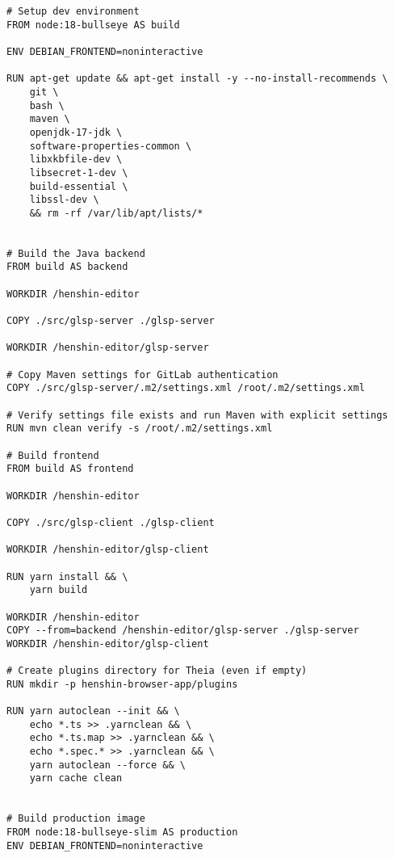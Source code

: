 
\begin{lstlisting}[language=Docker, caption={Dockerfile for Henshin Web Model Transformation Application}, label={lst:dockerfile}]
# Setup dev environment
FROM node:18-bullseye AS build

ENV DEBIAN_FRONTEND=noninteractive

RUN apt-get update && apt-get install -y --no-install-recommends \
    git \
    bash \
    maven \
    openjdk-17-jdk \
    software-properties-common \
    libxkbfile-dev \
    libsecret-1-dev \
    build-essential \
    libssl-dev \
    && rm -rf /var/lib/apt/lists/*


# Build the Java backend
FROM build AS backend

WORKDIR /henshin-editor

COPY ./src/glsp-server ./glsp-server

WORKDIR /henshin-editor/glsp-server

# Copy Maven settings for GitLab authentication
COPY ./src/glsp-server/.m2/settings.xml /root/.m2/settings.xml

# Verify settings file exists and run Maven with explicit settings
RUN mvn clean verify -s /root/.m2/settings.xml

# Build frontend
FROM build AS frontend

WORKDIR /henshin-editor

COPY ./src/glsp-client ./glsp-client

WORKDIR /henshin-editor/glsp-client

RUN yarn install && \
    yarn build

WORKDIR /henshin-editor
COPY --from=backend /henshin-editor/glsp-server ./glsp-server
WORKDIR /henshin-editor/glsp-client

# Create plugins directory for Theia (even if empty)
RUN mkdir -p henshin-browser-app/plugins

RUN yarn autoclean --init && \
    echo *.ts >> .yarnclean && \
    echo *.ts.map >> .yarnclean && \
    echo *.spec.* >> .yarnclean && \
    yarn autoclean --force && \
    yarn cache clean


# Build production image
FROM node:18-bullseye-slim AS production
ENV DEBIAN_FRONTEND=noninteractive


\end{lstlisting}
